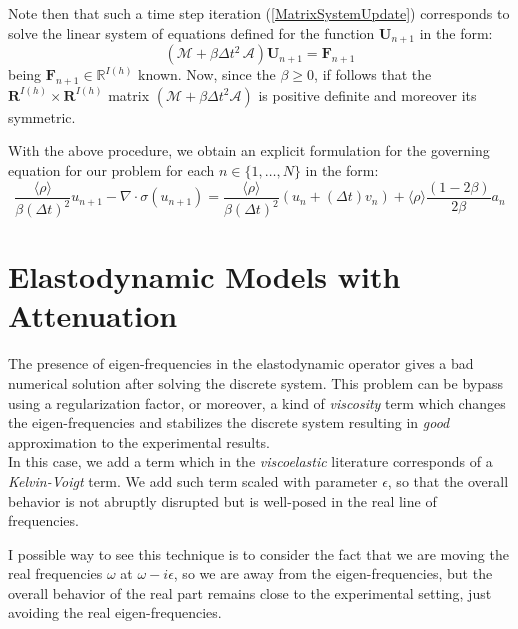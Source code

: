 Note then that such a time step iteration (\ref{MatrixSystemUpdate}) corresponds to solve the linear system of equations defined for the function $\mathbf{U}_{n+1}$ in the form:
\begin{equation*}
    (\mathcal{M}+ \beta \Delta t^2 \, \mathcal{A}) \mathbf{U}_{n+1} = \mathbf{F}_{n+1}
\end{equation*}
being $\mathbf{F}_{n+1} \in \mathbb{R}^{I(h)}$ known.
Now, since the $\beta \geq 0$, if follows that the $\mathbf{R}^{I(h)} \times \mathbf{R}^{I(h)}$ matrix $(\mathcal{M}+ \beta \Delta t^2 \mathcal{A})$ is positive definite and moreover its symmetric.


With the above procedure, we obtain an explicit formulation for the governing equation for our problem for each $n \in \{1,\dots, N\}$ in the form:
\begin{equation*}
    \frac{\langle\rho\rangle}{\beta (\Delta t)^2} u_{n+1} - \nabla \cdot \sigma(u_{n+1}) = \frac{\langle\rho\rangle}{\beta (\Delta t)^2} ( u_{n} + (\Delta t) v_n ) + \langle\rho\rangle\frac{(1-2\beta)}{2\beta} a_n
\end{equation*}

\section{Elastodynamic Models with Attenuation}
The presence of eigen-frequencies in the elastodynamic operator gives a bad numerical solution after solving the discrete system. This problem can be bypass using a regularization factor, or moreover, a kind of \textit{viscosity} term which changes the eigen-frequencies and stabilizes the discrete system resulting in \textit{good} approximation to the experimental results.\\
In this case, we add a term which in the \textit{viscoelastic} literature corresponds of a \textit{Kelvin-Voigt} term. We add such term scaled with parameter $\epsilon$, so that the overall behavior is not abruptly disrupted but is well-posed in the real line of frequencies.

\begin{rem}
I possible way to see this technique is to consider the fact that we are moving the real frequencies $\omega$ at $\omega - i\epsilon$, so we are away from the eigen-frequencies, but the overall behavior of the real part remains close to the experimental setting, just avoiding the real eigen-frequencies.
\end{rem}

